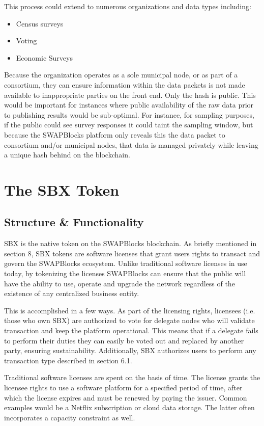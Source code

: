 \documentclass[12pt]{article}
\begin{document}
This process could extend to numerous organizations and data types including:

\begin{itemize}
	\item{Census surveys}
	\item{Voting}
	\item{Economic Surveys}
\end{itemize}

Because the organization operates as a sole municipal node, or as part of a consortium, they can ensure information within the data packets is not made available to inappropriate parties on the front end. Only the hash is public. This would be important for instances where public availability of the raw data prior to publishing results would be sub-optimal. For instance, for sampling purposes, if the public could see survey responses it could taint the sampling window, but because the SWAPBlocks platform only reveals this the data packet to consortium and/or municipal nodes, that data is managed privately while leaving a unique hash behind on the blockchain.


\section{The SBX Token}

\subsection{Structure \& Functionality}
SBX is the native token on the SWAPBlocks blockchain. As briefly mentioned in section 8, SBX tokens are software licenses that grant users rights to transact and govern the SWAPBlocks ecosystem. Unlike traditional software licenses in use today, by tokenizing the licenses SWAPBlocks can ensure that the public will have the ability to use, operate and upgrade the network regardless of the existence of any centralized business entity.

This is accomplished in a few ways. As part of the licensing rights, licensees (i.e. those who own SBX) are authorized to vote for delegate nodes who will validate transaction and keep the platform operational. This means that if a delegate fails to perform their duties they can easily be voted out and replaced by another party, ensuring sustainability. Additionally, SBX authorizes users to perform any transaction type described in section 6.1.

Traditional software licenses are spent on the basis of time. The license grants the licensee rights to use a software platform for a specified period of time, after which the license expires and must be renewed by paying the issuer. Common examples would be a Netflix subscription or cloud data storage. The latter often incorporates a capacity constraint as well.
\end{document}
